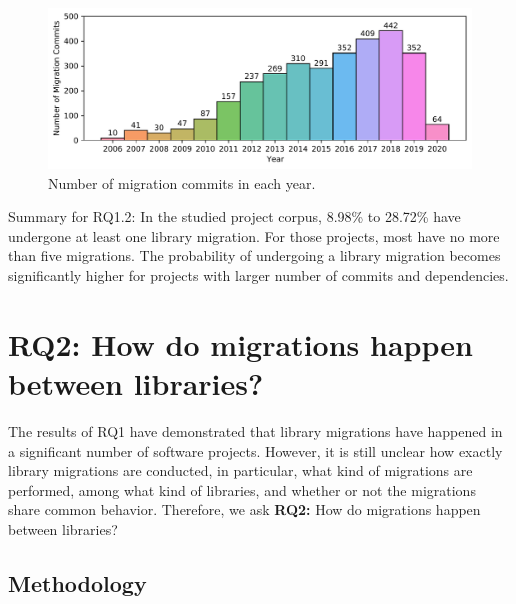 \documentclass[sigconf, screen]{acmart}
\begin{document}
\begin{figure}[t]
  \centering
  \includegraphics[width=\linewidth]{fig/migyear.pdf}
\vspace{-7mm}
  \caption{Number of migration commits in each year.}
  \label{fig:migyear}
\vspace{-4mm}
\end{figure}

\begin{result-rq}{Summary for RQ1.2:}
In the studied project corpus, 8.98\% to 28.72\% have undergone at least one library migration.
For those projects, most have no more than five migrations.
The probability of undergoing a library migration becomes significantly higher for projects with larger number of commits and dependencies.
\end{result-rq}

\section{RQ2: How do migrations happen between libraries?}

The results of RQ1 have demonstrated that library migrations have happened in a significant number of software projects.
However, it is still unclear how exactly library migrations are conducted, in particular, what kind of migrations are performed, among what kind of libraries, and whether or not the migrations share common behavior. %
Therefore, we ask \textbf{RQ2:} How do migrations happen between libraries?

\subsection{Methodology}
\end{document}
